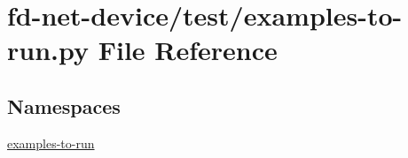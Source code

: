 \hypertarget{fd-net-device_2test_2examples-to-run_8py}{}\section{fd-\/net-\/device/test/examples-\/to-\/run.py File Reference}
\label{fd-net-device_2test_2examples-to-run_8py}
\subsection*{Namespaces}
\begin{DoxyCompactItemize}
\item 
 \hyperlink{namespaceexamples-to-run}{examples-\/to-\/run}
\end{DoxyCompactItemize}
